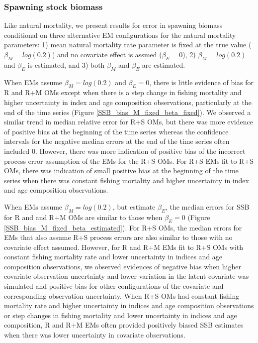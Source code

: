 \documentclass[
  12pt,
]{article}
\begin{document}
\hypertarget{spawning-stock-biomass}{%
\subsubsection*{Spawning stock biomass}\label{spawning-stock-biomass}}

Like natural mortality, we present results for error in spawning biomass conditional on three alternative EM configurations for the natural mortality parameters: 1) mean natural mortality rate parameter is fixed at the true value (\(\beta_M = log(0.2)\)) and no covariate effect is assmed (\(\beta_E = 0\)), 2) \(\beta_M = log(0.2)\) and \(\beta_E\) is estimated, and 3) both \(\beta_M\) and \(\beta_E\) are estimated.

When EMs assume \(\beta_M = log(0.2)\) and \(\beta_E = 0\), there is little evidence of bias for R and R+M OMs except when there is a step change in fishing mortality and higher uncertainty in index and age composition observations, particularly at the end of the time series (Figure \ref{SSB_bias_M_fixed_beta_fixed}). We observed a similar trend in median relative error for R+S OMs, but there was more evidence of positive bias at the beginning of the time series whereas the confidence intervals for the negative median errors at the end of the time series often included 0. However, there was more indication of positive bias of the incorrect process error assumption of the EMs for the R+S OMs. For R+S EMs fit to R+S OMs, there was indication of small positive bias at the beginning of the time series when there was constant fishing mortality and higher uncertainty in index and age composition observations.

When EMs assume \(\beta_M = log(0.2)\), but estimate \(\beta_E\), the median errors for SSB for R and and R+M OMs are similar to those when \(\beta_E = 0\) (Figure \ref{SSB_bias_M_fixed_beta_estimated}). For R+S OMs, the median errors for EMs that also assume R+S process errors are also similar to those with no covariate effect assumed. However, for R and R+M EMs fit to R+S OMs with constant fishing mortality rate and lower uncertainty in indices and age composition observations, we observed evidences of negative bias when higher covariate observation uncertainty and lower variation in the latent covariate was simulated and positive bias for other configurations of the covariate and corresponding observation uncertainty. When R+S OMs had constant fishing mortality rate and higher uncertainty in indices and age composition observations or step changes in fishing mortality and lower uncertainty in indices and age composition, R and R+M EMs often provided positively biased SSB estimates when there was lower uncertainty in covariate observations.
\end{document}
